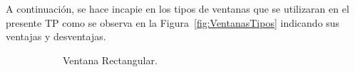      A continuación, se hace incapie en los tipos de ventanas que se utilizaran en el 
     presente TP como se observa en la Figura~\ref{fig:VentanasTipos} indicando sus 
     ventajas y desventajas.
        \begin{figure}[H]
            \centering
            \begin{subfigure}[H]{0.45\textwidth}
            \caption{Ventana Rectangular.}
            \label{fig:VentanaRec}
            \end{subfigure}
            \hfill 
            \begin{subfigure}[H]{0.45\textwidth}

\end{subfigure}
\end{figure}
